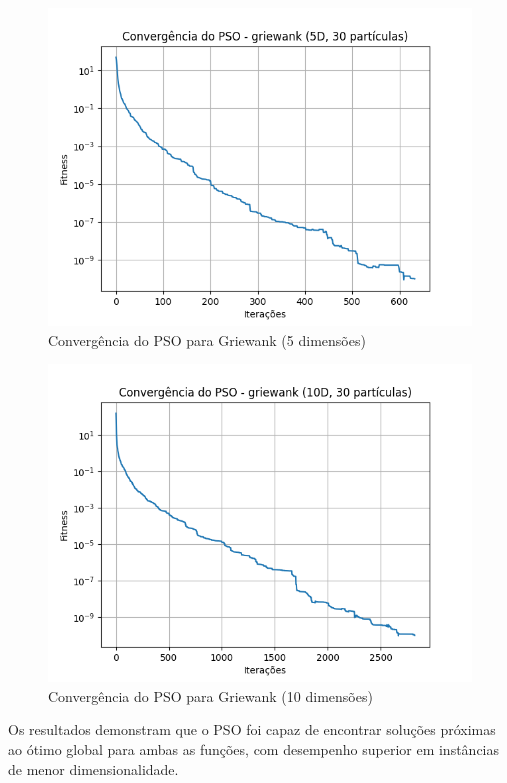 \documentclass[12pt]{article}
\begin{document}
\begin{figure}[H]
  \centering
  \includegraphics[width=.9\textwidth]{../graphs/convergencia_griewank_5D.png}
  \caption{Convergência do PSO para Griewank (5 dimensões)}
  \label{fig:convergencia_griewank_5d}
\end{figure}

\begin{figure}[H]
  \centering
  \includegraphics[width=.9\textwidth]{../graphs/convergencia_griewank_10D.png}
  \caption{Convergência do PSO para Griewank (10 dimensões)}
  \label{fig:convergencia_griewank_10d}
\end{figure}

Os resultados demonstram que o PSO foi capaz de encontrar soluções próximas ao ótimo global para ambas as funções, com desempenho superior em instâncias de menor dimensionalidade.
\end{document}

